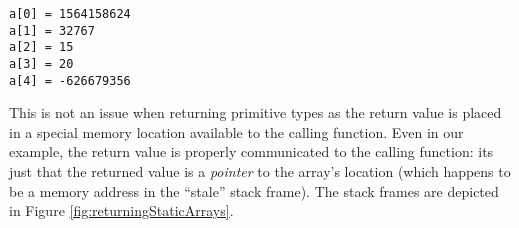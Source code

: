 \begin{verbatim}
a[0] = 1564158624
a[1] = 32767
a[2] = 15
a[3] = 20
a[4] = -626679356
\end{verbatim}

This is not an issue when returning primitive types as 
the return value is placed in a special memory location 
available to the calling function.  Even in our example, the
return value is properly communicated to the calling function:
its just that the returned value is a \emph{pointer} to the array's
location (which happens to be a memory address in the 
``stale'' stack frame).  The stack frames are depicted in Figure 
\ref{fig:returningStaticArrays}.

\begin{figure}[!h]
\centering
{}


\end{figure}
